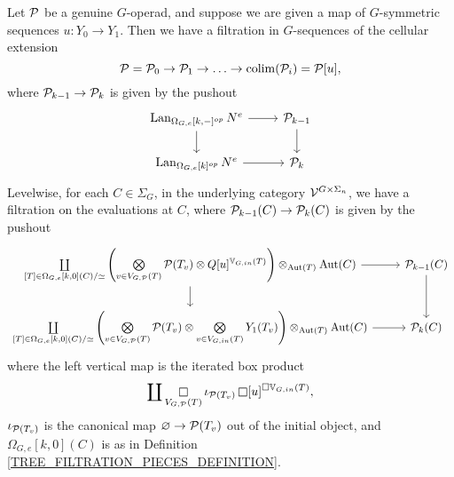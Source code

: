 \documentclass[a4paper,10pt]{article}%
\begin{document}
\begin{theorem}
  Let $\P$ be a genuine $G$-operad, and suppose we are given a map of $G$-symmetric sequences $u: Y_0 \to Y_1$. Then we have a filtration in $G$-sequences of the cellular extension
\[
\P = \P_0 \to \P_1 \to \ldots \to \colim(\P_i) = \P[u],
\]
where $\P_{k-1} \to \P_k$ is given by the pushout
\[
\begin{tikzcd}
  \Lan_{\Omega_{G,e}[k,-]^{op}}N^e \arrow[d] \arrow[r] & \P_{k-1} \arrow[d]\\
  \Lan_{\Omega_{G,e}[k]^{op}}N^e \arrow[r] & \P_k
\end{tikzcd}
\]
Levelwise, for each $C\in \Sigma_G$, in the underlying category $\V^{G\times\Sigma_n}$, we have a filtration on the evaluations at $C$, where $\P_{k-1}(C) \to \P_k(C)$ is given by the pushout
\[
\begin{tikzcd}
  \coprod\limits_{[T] \in \Omega_{G,e}[k,0](C)/\simeq} \left( \bigotimes\limits_{v \in V_{G,\P}(T)}\P(T_v) \otimes Q[u]^{\mathbb V_{G,in}(T)} \right) \otimes_{\mathrm{Aut}(T)} \mathrm{Aut}(C) \arrow[r] \arrow[d] & \P_{k-1}(C) \arrow[d] \\
   \coprod\limits_{[T] \in \Omega_{G,e}[k,0](C)/\simeq} \left( \bigotimes\limits_{v \in V_{G,\P}(T)}\P(T_v) \otimes \bigotimes\limits_{v \in V_{G,in}(T)} Y_1(T_v) \right) \otimes_{\mathrm{Aut}(T)} \mathrm{Aut}(C) \arrow[r] & \P_k(C)
\end{tikzcd}
\]
where the left vertical map is the iterated box product
\[
\coprod \mathop{\square}\limits_{V_{G,\P}(T)}\iota_{\P(T_v)}\mathop{\square} [u]^{\square \mathbb V_{G,in}(T)},
\]
$\iota_{\P(T_v)}$ is the canonical map $\varnothing \to \P(T_v)$ out of the initial object, and $\Omega_{G,e}[k,0](C)$ is as in Definition \ref{TREE_FILTRATION_PIECES_DEFINITION}.
\end{theorem}
\end{document}

